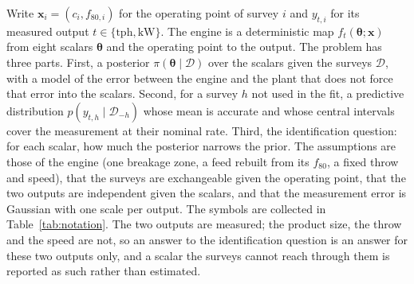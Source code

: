 \documentclass[journal]{IEEEtran}
\begin{document}
Write $\mathbf x_i=(c_i,f_{80,i})$ for the operating point of survey $i$ and $y_{t,i}$ for its measured output
$t\in\{\mathrm{tph},\mathrm{kW}\}$. The engine is a deterministic map $f_t(\boldsymbol\theta;\mathbf x)$ from eight scalars
$\boldsymbol\theta$ and the operating point to the output. The problem has three parts. First, a posterior
$\pi(\boldsymbol\theta\mid\mathcal D)$ over the scalars given the surveys $\mathcal D$, with a model of the error between
the engine and the plant that does not force that error into the scalars. Second, for a survey $h$ not used in the fit, a
predictive distribution $p(y_{t,h}\mid\mathcal D_{-h})$ whose mean is accurate and whose central intervals cover the
measurement at their nominal rate. Third, the identification question: for each scalar, how much the posterior narrows
the prior. The assumptions are those of the engine (one breakage zone, a feed rebuilt from its $f_{80}$, a fixed throw and
speed), that the surveys are exchangeable given the operating point, that the two outputs are independent given the
scalars, and that the measurement error is Gaussian with one scale per output. The symbols are collected in
Table~\ref{tab:notation}. The two outputs are measured; the product size, the throw and the speed are not, so an answer to
the identification question is an answer for these two outputs only, and a scalar the surveys cannot reach through them
is reported as such rather than estimated.
\end{document}
